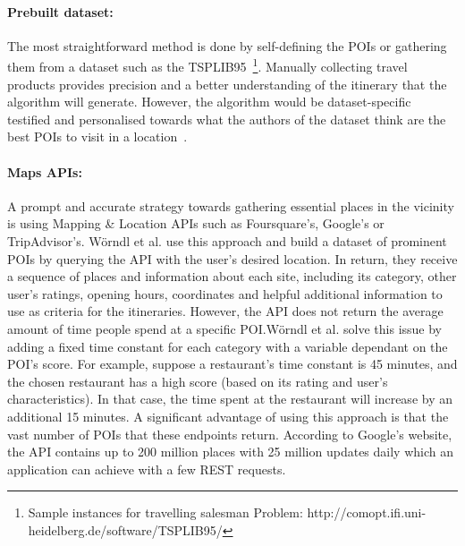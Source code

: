 \paragraph{Prebuilt dataset:} The most straightforward method is done by self-defining the POIs or gathering
them from a dataset such as the TSPLIB95~\footnote{Sample instances for
travelling salesman Problem:
http://comopt.ifi.uni-heidelberg.de/software/TSPLIB95/}. Manually collecting
travel products provides precision and a better understanding of the itinerary
that the algorithm will generate. However, the algorithm would be
dataset-specific testified and personalised towards what the authors of the
dataset think are the best POIs to visit in a location~\cite{Chou2021a,
Wisittipanich2020, Erbil}.

\paragraph{Maps APIs:} A prompt and accurate strategy towards gathering essential places in the
vicinity is using Mapping \& Location APIs such as Foursquare's, Google's or
TripAdvisor's. Wörndl et al.\cite{Worndl2017} use this approach and build a
dataset of prominent POIs by querying the API with the user's desired location.
In return, they receive a sequence of places and information about each site,
including its category, other user's ratings, opening hours, coordinates and
helpful additional information to use as criteria for the itineraries. However,
the API does not return the average amount of time people spend at a specific
POI.Wörndl et al.\cite{Worndl2017} solve this issue by adding a fixed time
constant for each category with a variable dependant on the POI's score. For
example, suppose a restaurant's time constant is 45 minutes, and the chosen
restaurant has a high score (based on its rating and user's characteristics).
In that case, the time spent at the restaurant will increase by an additional
15 minutes. A significant advantage of using this approach is that the vast
number of POIs that these endpoints return. According to Google's website, the
API contains up to 200 million places with 25 million updates daily which an
application can achieve with a few REST requests\cite{iltifat2014generation, googleSite}.


